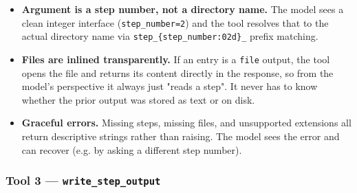 \documentclass[12pt, a4paper]{article}
\begin{document}
\begin{itemize}[leftmargin=1.5em]
  \item \textbf{Argument is a step number, not a directory name.} The model sees a clean integer interface (\texttt{step\_number=2}) and the tool resolves that to the actual directory name via \texttt{step\_\{step\_number:02d\}\_} prefix matching.
  \item \textbf{Files are inlined transparently.} If an entry is a \texttt{file} output, the tool opens the file and returns its content directly in the response, so from the model's perspective it always just "reads a step". It never has to know whether the prior output was stored as text or on disk.
  \item \textbf{Graceful errors.} Missing steps, missing files, and unsupported extensions all return descriptive strings rather than raising. The model sees the error and can recover (e.g. by asking a different step number).
\end{itemize}

\subsubsection{Tool 3 — \texttt{write\_step\_output}}
\end{document}
